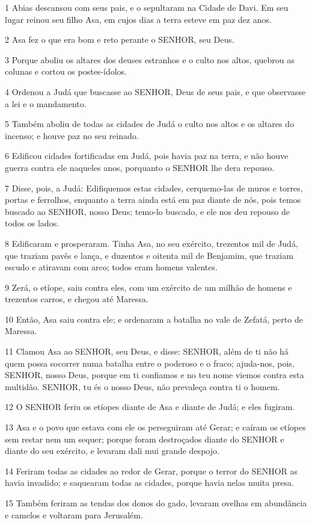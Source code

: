 \par 1 Abias descansou com seus pais, e o sepultaram na Cidade de Davi. Em seu lugar reinou seu filho Asa, em cujos dias a terra esteve em paz dez anos.
\par 2 Asa fez o que era bom e reto perante o SENHOR, seu Deus.
\par 3 Porque aboliu os altares dos deuses estranhos e o culto nos altos, quebrou as colunas e cortou os postes-ídolos.
\par 4 Ordenou a Judá que buscasse ao SENHOR, Deus de seus pais, e que observasse a lei e o mandamento.
\par 5 Também aboliu de todas as cidades de Judá o culto nos altos e os altares do incenso; e houve paz no seu reinado.
\par 6 Edificou cidades fortificadas em Judá, pois havia paz na terra, e não houve guerra contra ele naqueles anos, porquanto o SENHOR lhe dera repouso.
\par 7 Disse, pois, a Judá: Edifiquemos estas cidades, cerquemo-las de muros e torres, portas e ferrolhos, enquanto a terra ainda está em paz diante de nós, pois temos buscado ao SENHOR, nosso Deus; temo-lo buscado, e ele nos deu repouso de todos os lados.
\par 8 Edificaram e prosperaram. Tinha Asa, no seu exército, trezentos mil de Judá, que traziam pavês e lança, e duzentos e oitenta mil de Benjamim, que traziam escudo e atiravam com arco; todos eram homens valentes.
\par 9 Zerá, o etíope, saiu contra eles, com um exército de um milhão de homens e trezentos carros, e chegou até Maressa.
\par 10 Então, Asa saiu contra ele; e ordenaram a batalha no vale de Zefatá, perto de Maressa.
\par 11 Clamou Asa ao SENHOR, seu Deus, e disse: SENHOR, além de ti não há quem possa socorrer numa batalha entre o poderoso e o fraco; ajuda-nos, pois, SENHOR, nosso Deus, porque em ti confiamos e no teu nome viemos contra esta multidão. SENHOR, tu és o nosso Deus, não prevaleça contra ti o homem.
\par 12 O SENHOR feriu os etíopes diante de Asa e diante de Judá; e eles fugiram.
\par 13 Asa e o povo que estava com ele os perseguiram até Gerar; e caíram os etíopes sem restar nem um sequer; porque foram destroçados diante do SENHOR e diante do seu exército, e levaram dali mui grande despojo.
\par 14 Feriram todas as cidades ao redor de Gerar, porque o terror do SENHOR as havia invadido; e saquearam todas as cidades, porque havia nelas muita presa.
\par 15 Também feriram as tendas dos donos do gado, levaram ovelhas em abundância e camelos e voltaram para Jerusalém.

